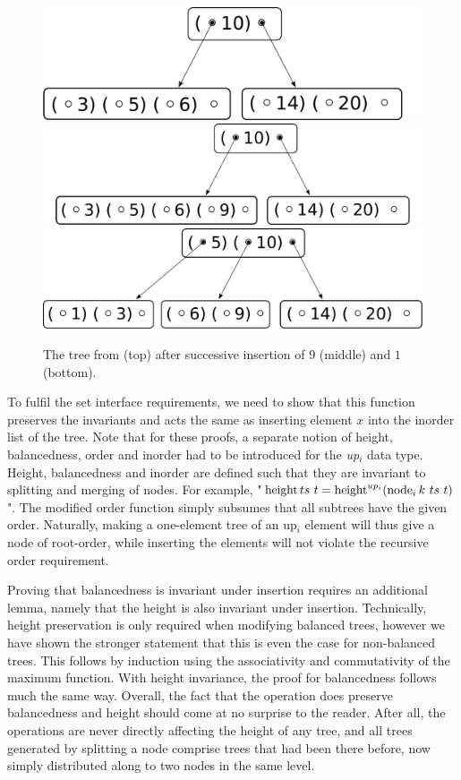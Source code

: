 \begin{figure}
    \centering
    \includegraphics[width=0.43\linewidth]{figures/btree-basic.pdf}\\
    \vspace*{1cm}
    \includegraphics[width=0.48\linewidth]{figures/btree-basic-ins9.pdf}\\
    \vspace*{1cm}
    \includegraphics[width=0.48\linewidth]{figures/btree-basic-ins9-ins1.pdf}
    \caption[An example B-Tree after two insertion operations]
    {The tree from  (top) after 
    successive insertion of $9$ (middle) and $1$ (bottom).}
    \label{fig:btree-basic-ins}
\end{figure}

To fulfil the set interface requirements,
we need to show that this function preserves the invariants
and acts the same as inserting element $x$ into the inorder list of the tree.
Note that for these proofs, a separate notion of height, balancedness, order
and inorder had to be introduced for the \textit{up}$_i$ data type.
Height, balancedness and inorder are
defined such that they are invariant to splitting and merging of nodes.
For example, "$\height ts\ t = \height^{up_i} (\node_i k\ ts\ t)$".
The modified order function simply subsumes that all subtrees have
the given order.
Naturally, making a one-element tree of an up$_i$ element will thus
give a node of root-order, while inserting the elements
will not violate the recursive order requirement.

Proving that balancedness is invariant 
under insertion requires an additional lemma,
namely that the height is also invariant under insertion.
Technically, height preservation is only required when modifying balanced
trees, however we have shown the stronger statement that this is even the case for non-balanced trees.
This follows by induction using the
associativity and commutativity of the maximum function.
With height invariance, the proof for balancedness follows much the same way.
Overall, the fact that the operation does preserve balancedness and
height should come at no surprise to the reader.
After all, the operations are never directly affecting the height of any tree,
and all trees generated by splitting a node comprise trees
that had been there before, now simply distributed along to two nodes
in the same level.

